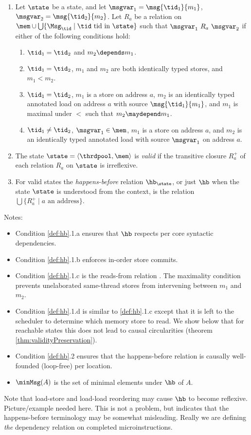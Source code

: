 \begin{definition}
\label{def:hb}
\mbox{}
\begin{enumerate}
\item Let $\state$ be a state, and let $\msgvar_1=\msg{\tid_1}{m_1}$, $\msgvar_2=\msg{\tid_2}{m_2}$. Let $R_a$ be a relation on $\mem\cup\bigcup\{\Msg_\tid\mid \tid\ \mbox{tid in }\state\}$ such that $\msgvar_1\ R_a\ \msgvar_2$ if
either of the following conditions hold:
\begin{enumerate}
\item $\tid_1 = \tid_2$ and $m_2 \depends m_1$.
\item $\tid_1 = \tid_2$, $m_1$ and $m_2$ are both identically typed stores, and $m_1 < m_2$.
\item $\tid_1=\tid_2$, $m_1$ is a store on address $a$, $m_2$ is an identically typed annotated load on address $a$ with source $\msg{\tid_1}{m_1}$, and
$m_1$ is maximal under $<$ such that $m_2\maydepend m_1$.
\item $\tid_1\neq\tid_2$, $\msgvar_1\in\mem$, $m_1$ is a store on address $a$, and $m_2$ is an identically typed annotated load with source $\msgvar_1$ on address $a$.
\end{enumerate}
\item The state $\state=\langle \thrdpool,\mem\rangle$ is \emph{valid} if the
transitive closure $R_a^+$ of each relation $R_a$ on $\state$ is irreflexive.
\item
For valid states the \emph{happens-before} relation $\hb_\state$, or just $\hb$ when the state $\state$ is understood from the context, is the relation
$\bigcup\{R_a^+\mid a\mbox{ an address}\}$.
\end{enumerate}
\end{definition}

Notes:
\begin{itemize}
\item Condition \ref{def:hb}.1.a ensures that $\hb$ respects per core syntactic dependencies.
\item Condition \ref{def:hb}.1.b enforces in-order store commits.
\item Condition \ref{def:hb}.1.c is the reads-from relation \cite{readsfrom}.
The maximality condition prevents unelaborated same-thread stores from intervening between $m_1$ and $m_2$.
\item Condition \ref{def:hb}.1.d is similar to \ref{def:hb}.1.c except that
it is left to the scheduler to determine which memory store to read. We show below that for reachable states this does not lead to causal circularities (theorem \ref{thm:validityPreservation}).
\item Condition \ref{def:hb}.2 ensures that the happens-before relation is causally well-founded (loop-free) per location. 
\item $\minMsg(A)$ is the set of minimal elements under $\hb$ of $A$.
\end{itemize}
%
Note that load-store and load-load reordering may cause $\hb$ to become reflexive. Picture/example needed here. This
is not a problem, but indicates that the happens-before terminology may be somewhat misleading. Really we are defining \emph{the} dependency relation on completed microinstructions. 

